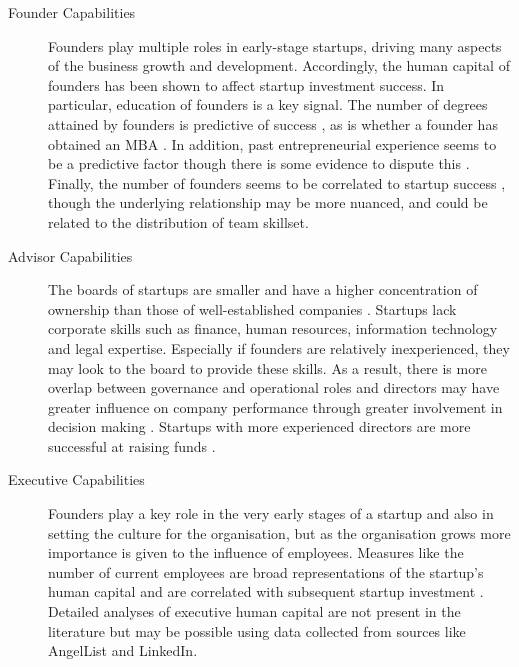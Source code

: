 \begin{description}

\item[Founder Capabilities]

Founders play multiple roles in early-stage startups, driving many aspects of the business growth and development. Accordingly, the human capital of founders has been shown to affect startup investment success. In particular, education of founders is a key signal. The number of degrees attained by founders is predictive of success \cite{beckwith2016,gimmon2010}, as is whether a founder has obtained an MBA \cite{beckwith2016}. In addition, past entrepreneurial experience seems to be a predictive factor \cite{gimmon2010} though there is some evidence to dispute this \cite{shan2014}. Finally, the number of founders seems to be correlated to startup success \cite{beckwith2016}, though the underlying relationship may be more nuanced, and could be related to the distribution of team skillset.

\item[Advisor Capabilities]

The boards of startups are smaller and have a higher concentration of ownership than those of well-established companies \cite{ingley2007}. Startups lack corporate skills such as finance, human resources, information technology and legal expertise. Especially if founders are relatively inexperienced, they may look to the board to provide these skills. As a result, there is more overlap between governance and operational roles and directors may have greater influence on company performance through greater involvement in decision making \cite{ingley2007}. Startups with more experienced directors are more successful at raising funds \cite{baum2004}.

\item[Executive Capabilities]

Founders play a key role in the very early stages of a startup and also in setting the culture for the organisation, but as the organisation grows more importance is given to the influence of employees. Measures like the number of current employees are broad representations of the startup's human capital and are correlated with subsequent startup investment \cite{beckwith2016,an2015,conti2013}. Detailed analyses of executive human capital are not present in the literature but may be possible using data collected from sources like AngelList and LinkedIn.

\end{description}


